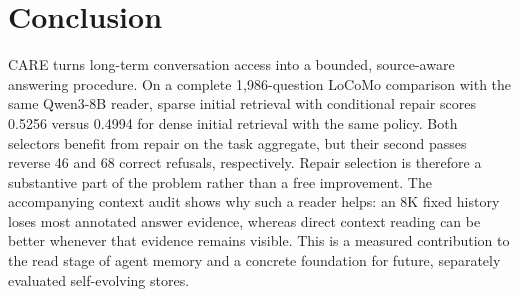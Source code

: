 \documentclass[11pt]{article}
\newcommand{\care}{\textsc{CARE}}
\begin{document}
\section{Conclusion}
\label{sec:conclusion}

\care{} turns long-term conversation access into a bounded, source-aware
answering procedure. On a complete 1,986-question LoCoMo comparison with
the same Qwen3-8B reader, sparse initial retrieval with conditional repair
scores 0.5256 versus 0.4994 for dense initial retrieval with the same policy.
Both selectors benefit from repair on the task aggregate, but their second
passes reverse 46 and 68 correct refusals, respectively. Repair selection is
therefore a substantive part of the problem rather than a free improvement.
The accompanying context audit shows why such a reader helps: an 8K fixed
history loses most annotated answer evidence, whereas direct context
reading can be better whenever that evidence remains visible. This is a
measured contribution to the read stage of agent memory and a concrete
foundation for future, separately evaluated self-evolving stores.



\end{document}
